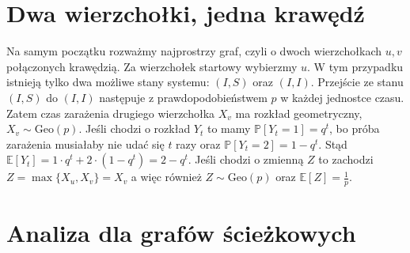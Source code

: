 \section{Dwa wierzchołki, jedna krawędź}

Na samym początku rozważmy najprostrzy graf, czyli o dwoch wierzchołkach $u,v$ połączonych krawędzią. Za wierzchołek startowy wybierzmy $u$. W tym przypadku istnieją tylko dwa możliwe stany systemu: $(I,S)$ oraz $(I,I)$. Przejście ze stanu $(I, S)$ do $(I, I)$ następuje z prawdopodobieństwem $p$ w każdej jednostce czasu. Zatem czas zarażenia drugiego wierzchołka $X_v$ ma rozkład geometryczny, $X_v \sim \mathrm{Geo}(p)$. Jeśli chodzi o rozkład $Y_t$ to mamy $\mathbb{P}[Y_t=1]=q^t$, bo próba zarażenia musiałaby nie udać się $t$ razy oraz $\mathbb{P}[Y_t=2]=1-q^t$. Stąd $\mathbb{E}[Y_t]=1\cdot q^t + 2 \cdot (1-q^t) = 2-q^t$. Jeśli chodzi o zmienną $Z$ to zachodzi $Z=\max\{X_u,X_v\}=X_v$ a więc również $Z\sim \mathrm{Geo}(p)$ oraz $\mathbb{E}[Z]=\frac{1}{p}$.


\section{Analiza dla grafów ścieżkowych}

